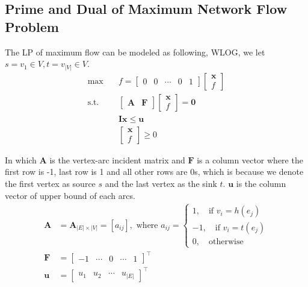             \subsection{Prime and Dual of Maximum Network Flow Problem}
                The LP of maximum flow can be modeled as following, WLOG, we let $s = v_1 \in V, t = v_{|V|} \in V$.
                \begin{align*}
                    \max \quad & f = \left[\begin{matrix}0 & 0 & \cdots & 0 & 1\end{matrix}\right]\left[\begin{matrix}\mathbf{x} \\ f\end{matrix}\right]\\
                    \text{s.t.} \quad & \left[\begin{matrix}\mathbf{A} & \mathbf{F}\end{matrix}\right]\left[\begin{matrix}\mathbf{x}\\ f\end{matrix}\right] = \mathbf{0}\\
                    & \mathbf{Ix} \le \mathbf{u}\\
                    & \left[\begin{matrix}\mathbf{x}\\ f\end{matrix}\right] \ge 0
                \end{align*}

                In which $\mathbf{A}$ is the vertex-arc incident matrix and $\mathbf{F}$ is a column vector where the first row is -1, last row is 1 and all other rows are 0s, which is because we denote the first vertex as source $s$ and the last vertex as the sink $t$. $\mathbf{u}$ is the column vector of upper bound of each arcs.
                \begin{align*}
                    \mathbf{A} &= \mathbf{A}_{|E|\times |V|} = [a_{ij}], \text{ where } a_{ij} = \begin{cases}
                        1, \quad \text{if $v_i = h(e_j)$} \\
                        -1, \quad \text{if $v_i = t(e_j)$} \\
                        0, \quad \text{otherwise}
                    \end{cases}\\
                    \mathbf{F} &= \left[\begin{matrix}-1 & \cdots & 0 & \cdots & 1\end{matrix}\right]^\top \\
                    \mathbf{u} &= \left[\begin{matrix}u_1 & u_2 & \cdots & u_{|E|}\end{matrix}\right]^\top
                \end{align*}


